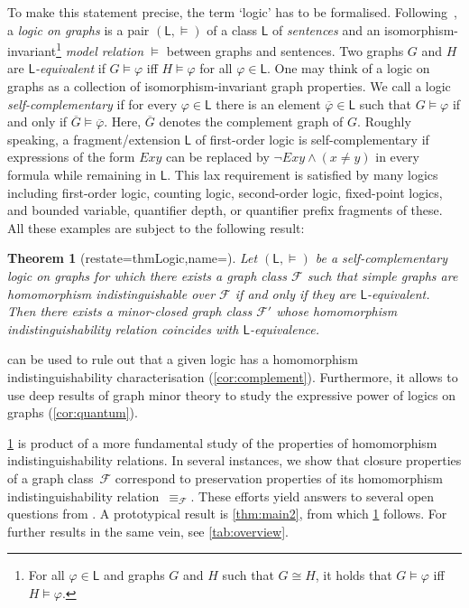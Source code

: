 \documentclass[3p,final]{elsarticle}
\renewcommand\phi\varphi
\newtheorem{theorem}{Theorem}
\begin{document}
	To make this statement precise, the term `logic' has to be formalised.	
	Following~\cite{barwise_extended_2017}, a \emph{logic on graphs} is a pair $(\mathsf{L}, \models)$ of a class $\mathsf{L}$ of \emph{sentences} and an isomorphism-invariant\footnote{For all $\phi \in \mathsf{L}$ and graphs $G$ and $H$ such that $G \cong H$, it holds that $G \models \phi$ iff $H \models \phi$.} \emph{model relation} $\models$ between graphs and sentences. 
	Two graphs $G$ and $H$ are \emph{$\mathsf{L}$-equivalent} if $G \models \phi$ iff $ H \models \phi$ for all $\phi \in \mathsf{L}$.
	One may think of a logic on graphs as a collection of isomorphism-invariant graph properties.
	We call a logic \emph{self-complementary} if for every $\phi \in \mathsf{L}$ there is an element $\overline{\phi} \in \mathsf{L}$ such that $G \models \phi$ if and only if $\overline{G} \models \overline{\phi}$.
	Here, $\overline{G}$ denotes the complement graph of $G$.
	Roughly speaking, a fragment/extension $\mathsf{L}$ of first-order logic is self-complementary if expressions of the form $Exy$ can be replaced by $\neg Exy \land (x \neq y)$ in every formula while remaining in $\mathsf{L}$.
	This lax requirement is satisfied by many logics including first-order logic, counting logic, second-order logic, fixed-point logics, and bounded variable, quantifier depth, or quantifier prefix fragments of these.
	All these examples are subject to the following result:
	
	\begin{theorem}[restate=thmLogic,name=]
		\label{thm:main1}
		Let $(\mathsf{L}, \models)$ be a self-complementary logic on graphs for which there exists a graph class
		$\mathcal{F}$ such that simple graphs are homomorphism indistinguishable over $\mathcal{F}$ if and only if they are $\mathsf{L}$-equivalent.
		Then there exists a minor-closed graph class $\mathcal{F}'$ whose homomorphism indistinguishability relation coincides with $\mathsf{L}$-equivalence.
	\end{theorem}

	 can be used to rule out that a given logic has a homomorphism indistinguishability characterisation (\cref{cor:complement}).
	Furthermore, it allows to use deep results of graph minor theory to study the expressive power of logics on graphs (\cref{cor:quantum}).
	
	\cref{thm:main1} is product of a more fundamental study of the properties of homomorphism indistinguishability relations. 
	In several instances, we show that closure properties of a graph class~$\mathcal{F}$ correspond to preservation properties of its homomorphism indistinguishability relation~$\equiv_{\mathcal{F}}$.
	These efforts yield answers to several open questions from \cite{roberson_oddomorphisms_2022}.
	A prototypical result is \cref{thm:main2}, from which \cref{thm:main1} follows. 
	For further results in the same vein, see \cref{tab:overview}.
	
\end{document}
